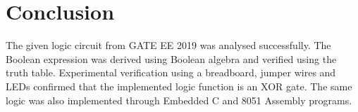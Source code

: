 \documentclass[12pt,a4paper]{article}
\begin{document}

\section{Conclusion}

The given logic circuit from GATE EE 2019 was analysed successfully. The Boolean expression was derived using Boolean algebra and verified using the truth table. Experimental verification using a breadboard, jumper wires and LEDs confirmed that the implemented logic function is an XOR gate. The same logic was also implemented through Embedded C and 8051 Assembly programs.
\end{document}

